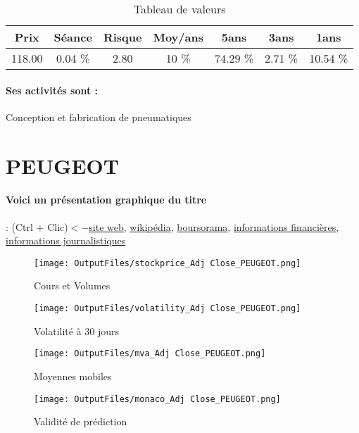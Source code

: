 \documentclass[11pt,a4paper]{report}%
\begin{document}
\begin{table}[H]
  \centering
    \begin{tabular}{|c|c|c|c|c|c|c|}
    \hline
    Prix & Séance & Risque  & Moy/ans & 5ans & 3ans & 1ans \\
    \hline
    118.00 &    0.04 \%    & 2.80 & 10 \% & 74.29 \% & 2.71 \% & 10.54 \% \\
    \hline
    \end{tabular}%
        \label{tab:table_MICHELIN}%
      \caption{Tableau de valeurs}
\end{table}%

\paragraph{Ses activités sont : } Conception et fabrication de pneumatiques 
    
    \newpage

\section{PEUGEOT}

\paragraph{Voici un présentation graphique du titre} : (Ctrl + Clic)$<-$\href{https://www.groupe-psa.com/fr/finance/publications-financieres/}{site web}, \href{https://fr.wikipedia.org/wiki/Peugeot}{wikipédia}, \href{https://www.boursorama.com/cours/1rPUG}{boursorama}, \href{https://www.qwant.com/?q=site:https:%2f%2fwww.easybourse.com%2faction-societe%2fPEUGEOT&t=web&client=ext-firefox-hp}{informations financières}, \href{https://bourse.lerevenu.com/cours-de-bourse/fiche-valeur-synthese/PEUGEOT/UG-FR}{informations journalistiques}
\begin{figure}[!htb]
   \begin{minipage}{0.5\textwidth}
     \centering
     \texttt{[image: OutputFiles/stockprice\_Adj Close\_PEUGEOT.png]}
     \caption{Cours et Volumes}\label{Fig:price_PEUGEOT}
   \end{minipage}\hfill
   \begin{minipage}{0.5\textwidth}
     \centering
     \texttt{[image: OutputFiles/volatility\_Adj Close\_PEUGEOT.png]}
     \caption{Volatilité à 30 jours}\label{Fig:volat_PEUGEOT}
   \end{minipage}
\end{figure}
\begin{figure}[!htb]
   \begin{minipage}{0.5\textwidth}
     \centering
     \texttt{[image: OutputFiles/mva\_Adj Close\_PEUGEOT.png]}
     \caption{Moyennes mobiles}\label{Fig:mva_PEUGEOT}
   \end{minipage}\hfill
   \begin{minipage}{0.5\textwidth}
     \centering
     \texttt{[image: OutputFiles/monaco\_Adj Close\_PEUGEOT.png]}
     \caption{Validité de prédiction}\label{Fig:prediction_PEUGEOT}
   \end{minipage}
\end{figure}
\end{document}
